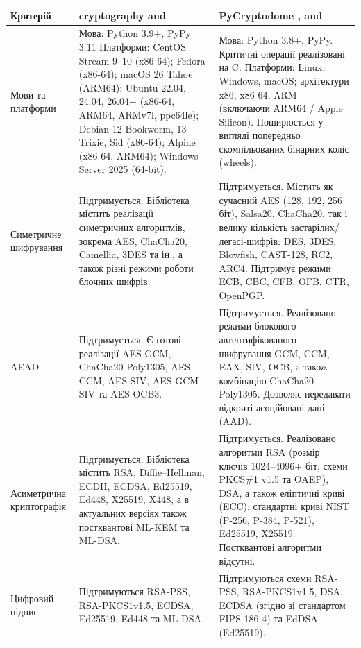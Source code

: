 \begin{longtable}{|p{2cm}|p{6cm}|p{6cm}|}
\hline
\textbf{Критерій} &
\textbf{cryptography \cite{cryptography} and \cite{cryptography git}} &
\textbf{PyCryptodome \cite{PyCryptodome}, \cite{PyCryptodome git} and \cite{NVD PyCryptodome}} \\
\hline

Мови та платформи &
Мова: Python 3.9+, PyPy 3.11
Платформи: CentOS Stream 9–10 (x86-64); Fedora (x86-64); macOS 26 Tahoe (ARM64); 
Ubuntu 22.04, 24.04, 26.04+ (x86-64, ARM64, ARMv7l, ppc64le); Debian 12 Bookworm, 13 Trixie, Sid (x86-64); 
Alpine (x86-64, ARM64); Windows Server 2025 (64-bit).&
Мова: Python 3.8+, PyPy. Критичні операції реалізовані на C.
Платформи: Linux, Windows, macOS; архітектури x86, x86-64, ARM (включаючи ARM64 / Apple Silicon). Поширюється у вигляді попередньо скомпільованих бінарних коліс (wheels). \\
\hline

Симетрич\-не шифрування &
Підтримується. Бібліотека містить реалізації симетричних алгоритмів, зокрема AES, ChaCha20, 
Camellia, 3DES та ін., а також різні режими роботи блочних шифрів.&
Підтримується. Містить як сучасний AES (128, 192, 256 біт), Salsa20, ChaCha20, так і велику кількість застарілих/легасі-шифрів: DES, 3DES, Blowfish, CAST-128, RC2, ARC4. Підтримує режими ECB, CBC, CFB, OFB, CTR, OpenPGP. \\
\hline

AEAD &
Підтримується. Є готові реалізації AES-GCM, ChaCha20-Poly1305, AES-CCM, AES-SIV, AES-GCM-SIV та AES-OCB3.&
Підтримується. Реалізовано режими блокового автентифікованого шифрування GCM, CCM, EAX, SIV, OCB, а також комбінацію ChaCha20-Poly1305. Дозволяє передавати відкриті асоційовані дані (AAD). \\
\hline

Асимет\-рична криптографія &
Підтримується. Бібліотека містить RSA, Diffie–Hellman, ECDH, ECDSA, Ed25519, Ed448, X25519, X448,
а в актуальних версіях також постквантові ML-KEM та ML-DSA.&
Підтримується. Реалізовано алгоритми RSA (розмір ключів 1024--4096+ біт, схеми PKCS\#1 v1.5 та OAEP), DSA, а також еліптичні криві (ECC): стандартні криві NIST (P-256, P-384, P-521), Ed25519, X25519. Постквантові алгоритми відсутні. \\
\hline

Цифровий підпис &
Підтримуються RSA-PSS, RSA-PKCS1v1.5, ECDSA, Ed25519, Ed448 та ML-DSA.&
Підтримуються схеми RSA-PSS, RSA-PKCS1v1.5, DSA, ECDSA (згідно зі стандартом FIPS 186-4) та EdDSA (Ed25519). \\
\hline


\end{longtable}
